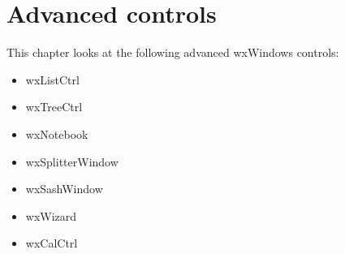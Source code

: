 \chapter{Advanced controls}\label{chapadvancedcontrols}
%
%
\setfooter{\thepage}{}{}{}{}{\thepage}%

This chapter looks at the following advanced wxWindows controls:

\begin{itemize}\itemsep=0pt
\item wxListCtrl
\item wxTreeCtrl
\item wxNotebook
\item wxSplitterWindow
\item wxSashWindow
\item wxWizard
\item wxCalCtrl
\end{itemize}

